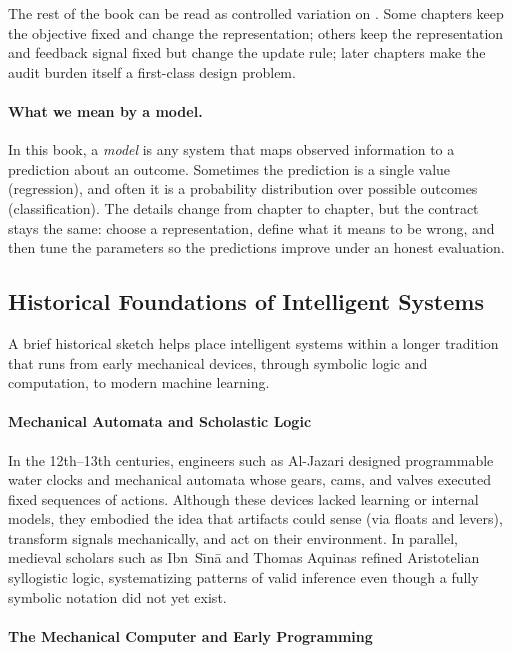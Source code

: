 The rest of the book can be read as controlled variation on . Some chapters keep the objective fixed and change the representation; others keep the representation and feedback signal fixed but change the update rule; later chapters make the audit burden itself a first-class design problem.

\paragraph{What we mean by a model.}
In this book, a \emph{model} is any system that maps observed information to a prediction about an outcome.
Sometimes the prediction is a single value (regression), and often it is a probability distribution over
possible outcomes (classification). The details change from chapter to chapter, but the contract stays the
same: choose a representation, define what it means to be wrong, and then tune the parameters so the
predictions improve under an honest evaluation.

\subsection{Historical Foundations of Intelligent Systems}
\label{sec:intro_historical_foundations_of_intelligent_systems}

A brief historical sketch helps place intelligent systems within a longer tradition that runs from early mechanical devices, through symbolic logic and computation, to modern machine learning.

\paragraph{Mechanical Automata and Scholastic Logic}

In the 12th--13th centuries, engineers such as Al-Jazari designed programmable water clocks and mechanical automata whose gears, cams, and valves executed fixed sequences of actions. Although these devices lacked learning or internal models, they embodied the idea that artifacts could sense (via floats and levers), transform signals mechanically, and act on their environment. In parallel, medieval scholars such as Ibn~S\={\i}n\={a} and Thomas Aquinas refined Aristotelian syllogistic logic, systematizing patterns of valid inference even though a fully symbolic notation did not yet exist.

\paragraph{The Mechanical Computer and Early Programming}

